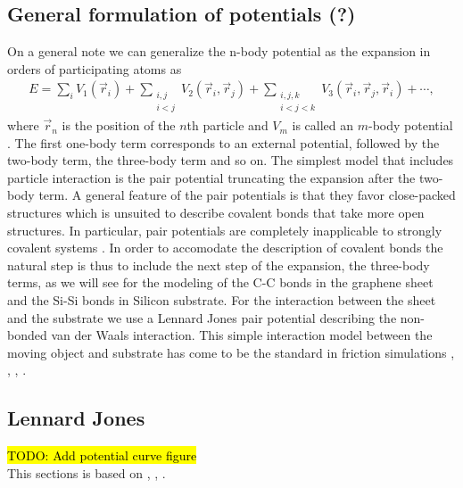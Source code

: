 \subsection{General formulation of potentials (?)}
On a general note we can generalize the n-body potential as the expansion in
orders of participating atoms as 
\begin{align*}
  E = \sum_i V_1(\vec{r}_i) + 
      \sum_{\substack{i, j \\ i < j}} V_2(\vec{r}_i, \vec{r}_j) +  
      \sum_{\substack{i,j,k \\ i < j < k}} V_3(\vec{r}_i, \vec{r}_j, \vec{r}_i) + \cdots,
\end{align*} 
where $\vec{r}_n$ is the position of the $n$th particle and $V_m$ is called an
$m$-body potential  \cite{PhysRevB.37.6991}. The first one-body term corresponds
to an external potential, followed by the two-body term, the three-body term and
so on. The simplest model that includes particle interaction is the pair
potential truncating the expansion after the two-body term. A general feature of
the pair potentials is that they favor close-packed structures which is unsuited
to describe covalent bonds that take more open structures. In particular, pair
potentials are completely inapplicable to strongly covalent systems \cite{PhysRevB.37.6991}. In order to accomodate the description
of covalent bonds the natural step is thus to include the next step of the
expansion, the three-body terms, as we will see for the modeling of the C-C bonds in the graphene sheet and the Si-Si bonds in Silicon substrate. For the interaction between
the sheet and the substrate we use a Lennard Jones pair potential
describing the non-bonded van der Waals interaction. This simple interaction model between the moving object and substrate has come to be the standard in friction simulations \cite{zhu_study_2018}, \cite{ZHANG201585}, \cite{Yoon2015MolecularDS}, \cite{kim_nano-scale_2009}. 


\subsection{Lennard Jones}
\hl{TODO: Add potential curve figure} \\
This sections is based on \cite{docs_lammps_LJ}, \cite{C9CP05445F}, \cite{chem_libretexts_LJ}.

